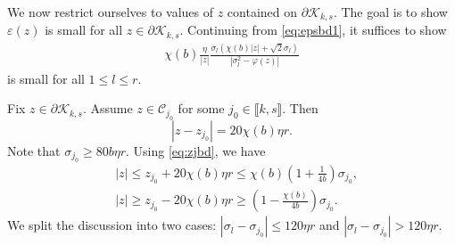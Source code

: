 \documentclass[reqno]{amsart}
\newcommand{\eps}{\varepsilon}
\theoremstyle{plain}
\theoremstyle{definition}
\begin{document}
We now restrict ourselves to values of $z$ contained on $\partial \mathcal{K}_{k,s}$. The goal is to show $\eps(z)$ is small for all $z\in \mathcal \partial \mathcal{K}_{k,s}$. Continuing from \eqref{eq:epsbd1}, it suffices to show 
\begin{align}\label{eq:bdeps}
\chi(b)\frac{\eta}{|z|}\frac{\sigma_l (\chi(b) |z|+\sqrt{2}\sigma_l)}{|\sigma_l^2 - \varphi(z)|}
\end{align}
is small for all $1\le l \le r.$ 

Fix $z\in \mathcal \partial \mathcal{K}_{k,s}$. Assume $z\in \mathcal{C}_{j_0}$ for some $j_0 \in \llbracket k, s\rrbracket$. Then $$|z-z_{j_0}| = 20 \chi(b) \eta r.$$ Note that $\sigma_{j_0} \ge 80 b \eta r$. Using \eqref{eq:zjbd}, we have
\begin{align}\label{eq:zulb}
&|z| \le z_{j_0} + 20\chi(b) \eta r \le  \chi(b)\left(1+ \frac{1}{4b} \right) \sigma_{j_0},\nonumber\\
&|z| \ge z_{j_0} - 20\chi(b) \eta r \ge \left( 1-\frac{\chi(b)}{4b}\right) \sigma_{j_0}.
\end{align}
We split the discussion into two cases: $|\sigma_l-\sigma_{j_0}| \le 120 \eta r$ and $|\sigma_l - \sigma_{j_0}| > 120 \eta r$.
\end{document}
